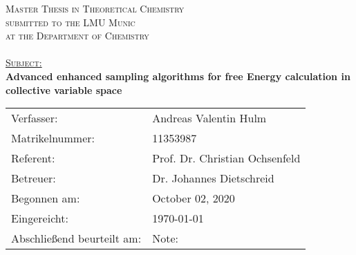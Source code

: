 
\begin{titlepage}

\begin{center}

{\fontsize{14pt}{14}

\textsc{Master Thesis in Theoretical Chemistry} \\
\vspace{0.5cm}
\textsc{submitted to the LMU Munic}\\
\vspace{0.5cm}
\textsc{at the Department of Chemistry}\\
\vspace{0.5cm}
\textsc{}\\[3cm]

\textsc{\Large  \underline{Subject:}}\\[3.0cm]

\textbf{\Large Advanced enhanced sampling algorithms for free Energy calculation in collective variable space}\\[6cm]
}
{\fontsize{12pt}{12} \selectfont%
\begin{tabular}{ll}
Verfasser:& Andreas Valentin Hulm \\
Matrikelnummer:& 11353987\\
Referent:& Prof. Dr. Christian Ochsenfeld\\
Betreuer:& Dr. Johannes Dietschreid\\[1cm]
Begonnen am:& October 02, 2020\\
Eingereicht:& \today\\
Abschließend beurteilt am:&   \hspace{4cm} Note: \\
\end{tabular}
}
\end{center}

\end{titlepage}
